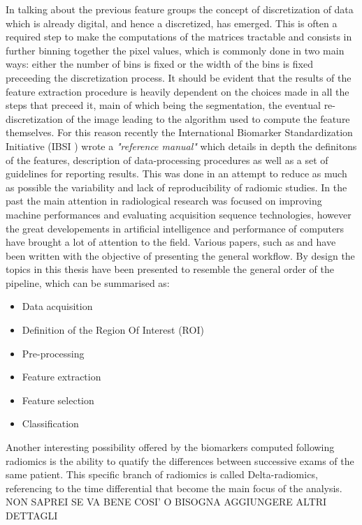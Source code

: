 In talking about the previous feature groups the concept of discretization of data which is already digital, and hence a discretized, has emerged. This is often a required step to make the computations of the matrices tractable and consists in further binning together the pixel values, which is commonly done in two main ways: either the number of bins is fixed or the width of the bins is fixed preceeding the discretization process.
It should be evident that the results of the feature extraction procedure is heavily dependent on the choices made in all the steps that preceed it, main of which being the segmentation, the eventual re-discretization of the image leading to the algorithm used to compute the feature themselves. For this reason recently the International Biomarker Standardization Initiative (IBSI \cite{IBSI}) wrote a \textit{"reference manual"} which details in depth the definitons of the features, description of data-processing procedures as well as a set of guidelines for reporting results. This was done in an attempt to reduce as much as possible the variability and lack of reproducibility of radiomic studies.
In the past the main attention in radiological research was focused on improving machine performances and evaluating acquisition sequence technologies, however the great developements in artificial intelligence and performance of computers have brought a lot of attention to the field. Various papers, such as \cite{Rad_review} and \cite{Rad_review_ger} have been written with the objective of presenting the general workflow. By design the topics in this thesis have been presented to resemble the general order of the pipeline, which can be summarised as:

\begin{itemize}
\item Data acquisition
\item Definition of the Region Of Interest (ROI)
\item Pre-processing
\item Feature extraction
\item Feature selection
\item Classification
\end{itemize}

Another interesting possibility offered by the biomarkers computed following radiomics is the ability to quatify the differences between successive exams of the same patient. This specific branch of radiomics is called Delta-radiomics, referencing to the time differential that become the main focus of the analysis.
{\large NON SAPREI SE VA BENE COSI' O BISOGNA AGGIUNGERE ALTRI DETTAGLI}

